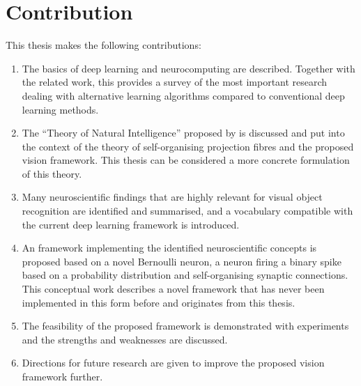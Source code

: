 \section{Contribution}
This thesis makes the following contributions:
\begin{enumerate}
	\item The basics of deep learning and neurocomputing are described. Together with the related work, this provides a survey of the most important research dealing with alternative learning algorithms compared to conventional deep learning methods.
	\item The ``Theory of Natural Intelligence'' proposed by  is discussed and put into the context of the theory of self-organising projection fibres  and the proposed vision framework. This thesis can be considered a more concrete formulation of this theory.
    \item Many neuroscientific findings that are highly relevant for visual object recognition are identified and summarised, and a vocabulary compatible with the current deep learning framework is introduced.
	\item An framework implementing the identified neuroscientific concepts is proposed based on a novel Bernoulli neuron,  a neuron firing a binary spike based on a probability distribution and self-organising synaptic connections. This conceptual work describes a novel framework that has never been implemented in this form before and originates from this thesis. 
    \item The feasibility of the proposed framework is demonstrated with experiments and the strengths and weaknesses are discussed.
    \item Directions for future research are given to improve the proposed vision framework further.
\end{enumerate}


